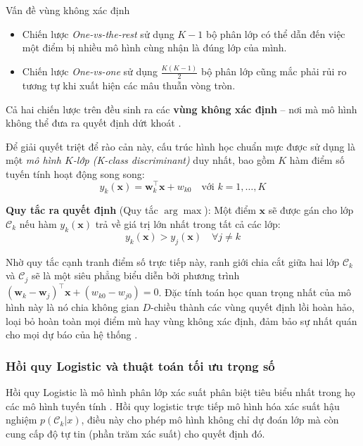 \begin{warningbox}{Vấn đề vùng không xác định}
\begin{itemize}
    \item Chiến lược \textit{One-vs-the-rest} sử dụng $K-1$ bộ phân lớp có thể dẫn đến việc một điểm bị nhiều mô hình cùng nhận là đúng lớp của mình.
    \item Chiến lược \textit{One-vs-one} sử dụng $\frac{K(K-1)}{2}$ bộ phân lớp cũng mắc phải rủi ro tương tự khi xuất hiện các mâu thuẫn vòng tròn.
\end{itemize}
Cả hai chiến lược trên đều sinh ra các \textbf{vùng không xác định} – nơi mà mô hình không thể đưa ra quyết định dứt khoát \cite{bishop2006pattern}.
\end{warningbox}

Để giải quyết triệt để rào cản này, cấu trúc hình học chuẩn mực được sử dụng là một \textit{mô hình $K$-lớp (K-class discriminant)} duy nhất, bao gồm $K$ hàm điểm số tuyến tính hoạt động song song:
\begin{equation}
    y_k(\mathbf{x}) = \mathbf{w}_k^\top \mathbf{x} + w_{k0} \quad \text{với } k = 1, \dots, K
\end{equation}

\textbf{Quy tắc ra quyết định} (Quy tắc $\arg\max$): Một điểm $\mathbf{x}$ sẽ được gán cho lớp $\mathcal{C}_k$ nếu hàm $y_k(\mathbf{x})$ trả về giá trị lớn nhất trong tất cả các lớp:
\begin{equation}
    y_k(\mathbf{x}) > y_j(\mathbf{x}) \quad \forall j \neq k
\end{equation}

Nhờ quy tắc cạnh tranh điểm số trực tiếp này, ranh giới chia cắt giữa hai lớp $\mathcal{C}_k$ và $\mathcal{C}_j$ sẽ là một siêu phẳng biểu diễn bởi phương trình $(\mathbf{w}_k - \mathbf{w}_j)^\top \mathbf{x} + (w_{k0} - w_{j0}) = 0$. Đặc tính toán học quan trọng nhất của mô hình này là nó chia không gian $D$-chiều thành các vùng quyết định lồi hoàn hảo, loại bỏ hoàn toàn mọi điểm mù hay vùng không xác định, đảm bảo sự nhất quán cho mọi dự báo của hệ thống \cite{bishop2006pattern}.

\subsubsection{Hồi quy Logistic và thuật toán tối ưu trọng số}

Hồi quy Logistic là mô hình phân lớp xác suất phân biệt tiêu biểu nhất trong họ các mô hình tuyến tính \cite{bishop2006pattern}. Hồi quy logistic trực tiếp mô hình hóa xác suất hậu nghiệm $p(\mathcal{C}_k | x)$, điều này cho phép mô hình không chỉ dự đoán lớp mà còn cung cấp độ tự tin (phần trăm xác suất) cho quyết định đó.

